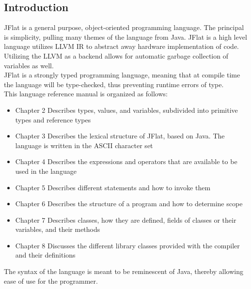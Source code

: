 \begin{homeworkProblem}
	\chapter{Introduction}
	JFlat is a general purpose, object-oriented programming language. The principal is simplicity, pulling many themes of the language from Java. JFlat is a high level language utilizes LLVM IR to abstract away hardware implementation of code. Utilizing the LLVM as a backend allows for automatic garbage collection of variables as well. \\
	JFlat is a strongly typed programming language, meaning that at compile time the language will be type-checked, thus preventing runtime errors of type. \\
	This language reference manual is organized as follows:\\
	\begin{itemize}
		\item Chapter 2 Describes types, values, and variables, subdivided into primitive types and reference types
		\item Chapter 3 Describes the lexical structure of JFlat, based on Java. The language is written in the ASCII character set
		\item Chapter 4 Describes the expressions and operators that are available to be used in the language
		\item Chapter 5 Describes different statements and how to invoke them
		\item Chapter 6 Describes the structure of a program and how to determine scope
		\item Chapter 7 Describes classes, how they are defined, fields of classes or their variables, and their methods
		\item Chapter 8 Discusses the different library classes provided with the compiler and their definitions
	\end{itemize}
	The syntax of the language is meant to be reminescent of Java, thereby allowing ease of use for the programmer. 
\end{homeworkProblem}

